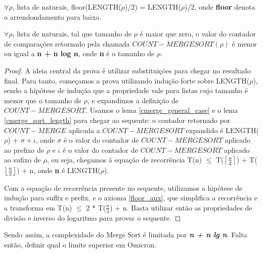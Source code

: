 \begin{axiom}
  \label{floor_aux}
  $\forall \rho$, lista de naturais, floor(LENGTH($\rho$)/2) 
  = LENGTH($\rho$)/2, onde
  \textbf{floor} denota o arrendondamento para baixo. 
\end{axiom}

\begin{lemma}
  \label{merge_sort_ws}
  $\forall \rho$, lista de naturais, tal que tamanho de $\rho$ é maior
  que zero, o valor do contador de comparações retornado pela chamada 
  $COUNT-MERGESORT(\rho)$ é menor ou igual a \textbf{n + n log n}, onde
  \textbf{n} é o tamanho de $\rho$.
\end{lemma}

\begin{proof}
  A ideia central da prova é utilizar substituições para
  chegar no resultado final. Para tanto, começamos a prova utilizando
  indução forte sobre LENGTH($\rho$), sendo a hipótese de indução
  que a propriedade vale para listas cujo tamanho é menor que o tamanho
  de $\rho$, e expandimos a definição de $COUNT-MERGESORT$. 
  Usamos o lema \ref{cmerge_general_case} e o lema \ref{cmerge_sort_length}
  para chegar ao sequente: o contador retornado por $COUNT-MERGE$ 
  aplicada a $COUNT-MERGESORT$ expandido é LENGTH($\rho$) + 
  $\sigma + \iota$, onde $\sigma$ é o valor do contador de $COUNT-MERGESORT$
  aplicado ao prefixo de $\rho$ e $\iota$ é o valor do contador de $COUNT-MERGESORT$
  aplicado ao sufixo de $\rho$, ou seja, chegamos à equação de recorrência
  T(n) $\le$ T($\left\lceil \frac{n}{2} \right\rceil$) + T($\left\lfloor \frac{n}{2} \right\rfloor$) + n, onde \textbf{n}
  é LENGTH($\rho$).

  Com a equação de recorrência presente no sequente, utilizamos a hipótese 
  de indução para suffix e prefix, e o axioma \ref{floor_aux}, 
  que simplifica a recorrência e a transforma em T(n) $\le$ 
  2 * T($\frac{n}{2}$) + n. Basta utilizar então as propriedades de
  divisão e inverso do logaritmo para provar o sequente.
\end{proof}

Sendo assim, a complexidade do Merge Sort é limitada por 
\textit{\textbf{n + n lg n}}. Falta então, definir qual o limite
superior em Omicron.